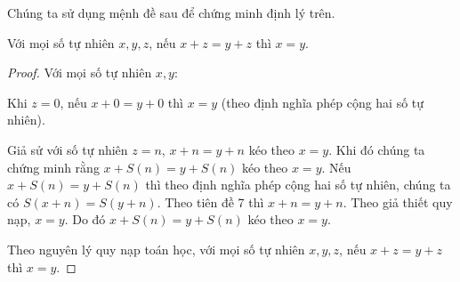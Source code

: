 \noindent Chúng ta sử dụng mệnh đề sau để chứng minh định lý trên.

\begin{proposition}\label{proposition:addition-cancellation}
    Với mọi số tự nhiên $x, y, z$, nếu $x + z = y + z$ thì $x = y$.
\end{proposition}

\begin{proof}
    Với mọi số tự nhiên $x, y$:

    Khi $z = 0$, nếu $x + 0 = y + 0$ thì $x = y$ (theo định nghĩa phép cộng hai số tự nhiên).

    Giả sử với số tự nhiên $z = n$, $x + n = y + n$ kéo theo $x = y$. Khi đó chúng ta chứng minh rằng $x + S(n) = y + S(n)$ kéo theo $x = y$. Nếu $x + S(n) = y + S(n)$ thì theo định nghĩa phép cộng hai số tự nhiên, chúng ta có $S(x + n) = S(y + n)$. Theo tiên đề 7 thì $x + n = y + n$. Theo giả thiết quy nạp, $x = y$. Do đó $x + S(n) = y + S(n)$ kéo theo $x = y$.

    Theo nguyên lý quy nạp toán học, với mọi số tự nhiên $x, y, z$, nếu $x + z = y + z$ thì $x = y$.
\end{proof}

